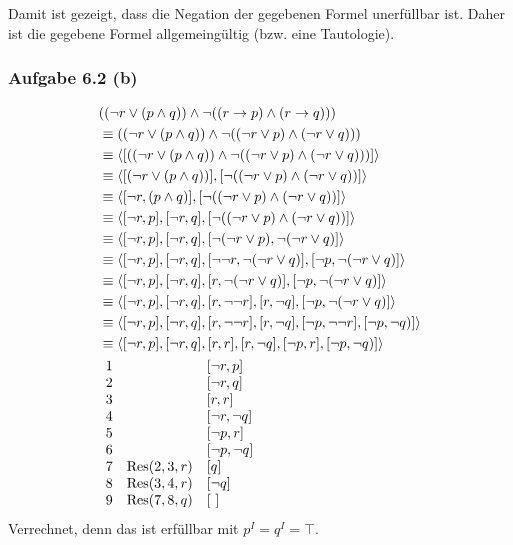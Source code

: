 Damit ist gezeigt, dass die Negation der gegebenen Formel unerfüllbar ist. 
Daher ist die gegebene Formel allgemeingültig (bzw. eine Tautologie).

\subsubsection{Aufgabe 6.2 (b)}
\begin{align*}
	&((\neg r\vee(p\wedge q))\wedge\neg((r\to p)\wedge(r\to q)))\\
	&\equiv
	((\neg r\vee(p\wedge q))\wedge\neg((\neg r\vee p)\wedge(\neg r\vee q)))\\
	&\equiv
	\langle[((\neg r\vee(p\wedge q))\wedge\neg((\neg r\vee p)\wedge(\neg r\vee q)))]\rangle\\
	&\equiv
	\langle[(\neg r\vee(p\wedge q))],[\neg((\neg r\vee p)\wedge(\neg r\vee q))]\rangle\\
	&\equiv
	\langle[\neg r,(p\wedge q)],[\neg((\neg r\vee p)\wedge(\neg r\vee q))]\rangle\\
	&\equiv
	\langle[\neg r, p],[\neg r, q],[\neg((\neg r\vee p)\wedge(\neg r\vee q))]\rangle\\
	&\equiv
	\langle[\neg r, p],[\neg r, q],[\neg(\neg r\vee p),\neg(\neg r\vee q)]\rangle\\
	&\equiv
	\langle[\neg r, p],[\neg r, q],[\neg\neg r,\neg(\neg r\vee q)],[\neg p,\neg(\neg r\vee q)]\rangle\\
	&\equiv
	\langle[\neg r, p],[\neg r, q],[r,\neg(\neg r\vee q)],[\neg p,\neg(\neg r\vee q)]\rangle\\
	&\equiv
	\langle[\neg r, p],[\neg r, q],[r,\neg\neg r],[r,\neg q],[\neg p,\neg(\neg r\vee q)]\rangle\\
	&\equiv
	\langle[\neg r, p],[\neg r, q],[r,\neg\neg r],[r,\neg q],[\neg p,\neg\neg r],[\neg p,\neg q)]\rangle\\
	&\equiv
	\langle[\neg r, p],[\neg r, q],[r,r],[r,\neg q],[\neg p, r],[\neg p,\neg q)]\rangle\\
	&\begin{array}{rll}
		1 &&[\neg r,p]\\
		2 &&[\neg r,q]\\
		3 &&[r,r]\\
		4 &&[\neg r,\neg q]\\
		5 &&[\neg p,r]\\
		6 &&[\neg p,\neg q]\\
		7 & \operatorname{Res}(2,3,r) & [q]\\
		8 & \operatorname{Res}(3,4,r) & [\neg q]\\
		9 & \operatorname{Res}(7,8,q) & [~]
	\end{array}
\end{align*}
Verrechnet, denn das ist erfüllbar mit $p^I=q^I=\top$.

